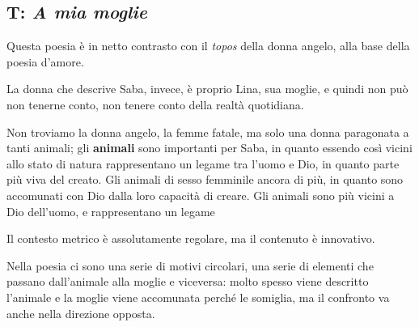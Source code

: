 
\subsection{T: \textit{A mia moglie}}

Questa poesia è in netto contrasto con il \textit{topos} della donna angelo, alla base della poesia d'amore.

La donna che descrive Saba, invece, è proprio Lina, sua moglie, e quindi non può non tenerne conto, non tenere conto della realtà quotidiana.

Non troviamo la donna angelo, la femme fatale, ma solo una donna paragonata a tanti animali; gli \textbf{animali} sono importanti per Saba, in quanto essendo così vicini allo stato di natura rappresentano un legame tra l'uomo e Dio, in quanto parte più viva del creato. Gli animali di sesso femminile ancora di più, in quanto sono accomunati con Dio dalla loro capacità di creare.
Gli animali sono più vicini a Dio dell'uomo, e rappresentano un legame

Il contesto metrico è assolutamente regolare, ma il contenuto è innovativo.

Nella poesia ci sono una serie di motivi circolari, una serie di elementi che passano dall'animale alla moglie e viceversa: molto spesso viene descritto l'animale e la moglie viene accomunata perché le somiglia, ma il confronto va anche nella direzione opposta.

